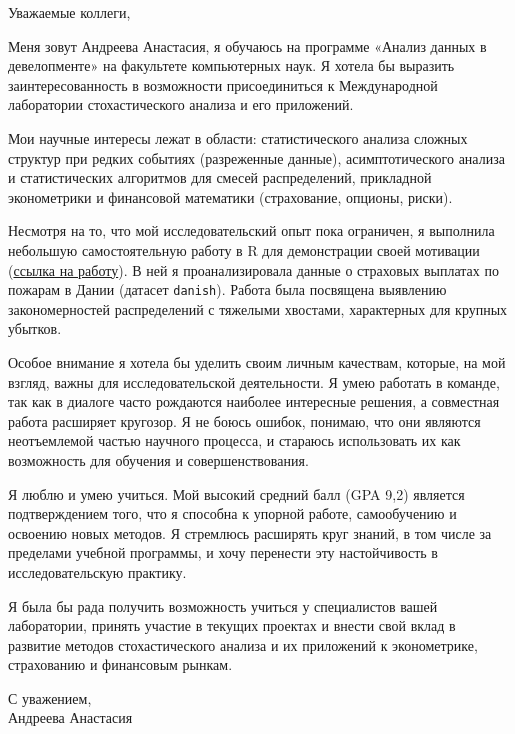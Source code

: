 \documentclass[11pt, a4paper, oneside]{letter}
\begin{document}
Уважаемые коллеги,

Меня зовут Андреева Анастасия, я обучаюсь на программе «Анализ данных в девелопменте» на факультете компьютерных наук. Я хотела бы выразить заинтересованность в возможности присоединиться к Международной лаборатории стохастического анализа и его приложений.

Мои научные интересы лежат в области: статистического анализа сложных структур при редких событиях (разреженные данные), асимптотического анализа и статистических алгоритмов для смесей распределений, прикладной эконометрики и финансовой математики (страхование, опционы, риски).

Несмотря на то, что мой исследовательский опыт пока ограничен, я выполнила небольшую самостоятельную работу в R для демонстрации своей мотивации (\href{https://github.com/entoshik/R/blob/main/danish_fire_claims_pareto_analysis.pdf}{ссылка на работу}). В ней я проанализировала данные о страховых выплатах по пожарам в Дании (датасет \texttt{danish}). Работа была посвящена выявлению закономерностей распределений с тяжелыми хвостами, характерных для крупных убытков.

Особое внимание я хотела бы уделить своим личным качествам, которые, на мой взгляд, важны для исследовательской деятельности. Я умею работать в команде, так как в диалоге часто рождаются наиболее интересные решения, а совместная работа расширяет кругозор. Я не боюсь ошибок, понимаю, что они являются неотъемлемой частью научного процесса, и стараюсь использовать их как возможность для обучения и совершенствования.

Я люблю и умею учиться. Мой высокий средний балл (GPA 9,2) является подтверждением того, что я способна к упорной работе, самообучению и освоению новых методов. Я стремлюсь расширять круг знаний, в том числе за пределами учебной программы, и хочу перенести эту настойчивость в исследовательскую практику.

Я была бы рада получить возможность учиться у специалистов вашей лаборатории, принять участие в текущих проектах и внести свой вклад в развитие методов стохастического анализа и их приложений к эконометрике, страхованию и финансовым рынкам.

\vspace{1cm}

\begin{flushright}
С уважением, \\
Андреева Анастасия
\end{flushright}
\end{document}
